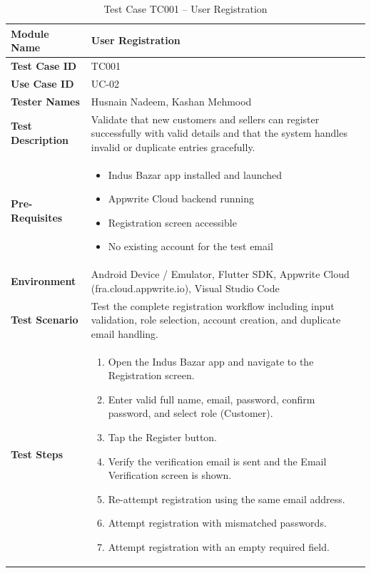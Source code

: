 \begin{table}[H]
\centering
\caption{Test Case TC001 -- User Registration}
\label{tab:tc001}
\renewcommand{\arraystretch}{1.15}
\small
\begin{tabular}{|p{3.2cm}|p{10.8cm}|}
\hline
\textbf{Module Name} & User Registration \\ \hline
\textbf{Test Case ID} & TC001 \\ \hline
\textbf{Use Case ID} & UC-02 \\ \hline
\textbf{Tester Names} & Husnain Nadeem, Kashan Mehmood \\ \hline
\textbf{Test Description} & Validate that new customers and sellers can register successfully with valid details and that the system handles invalid or duplicate entries gracefully. \\ \hline
\textbf{Pre-Requisites} &
\begin{itemize}[leftmargin=*,noitemsep]
\item Indus Bazar app installed and launched
\item Appwrite Cloud backend running
\item Registration screen accessible
\item No existing account for the test email
\end{itemize} \\ \hline
\textbf{Environment} & Android Device / Emulator, Flutter SDK, Appwrite Cloud (fra.cloud.appwrite.io), Visual Studio Code \\ \hline
\textbf{Test Scenario} & Test the complete registration workflow including input validation, role selection, account creation, and duplicate email handling. \\ \hline
\textbf{Test Steps} &
\begin{enumerate}[leftmargin=*,noitemsep]
\item Open the Indus Bazar app and navigate to the Registration screen.
\item Enter valid full name, email, password, confirm password, and select role (Customer).
\item Tap the Register button.
\item Verify the verification email is sent and the Email Verification screen is shown.
\item Re-attempt registration using the same email address.
\item Attempt registration with mismatched passwords.
\item Attempt registration with an empty required field.
\end{enumerate} \\ \hline

\end{tabular}
\end{table}
